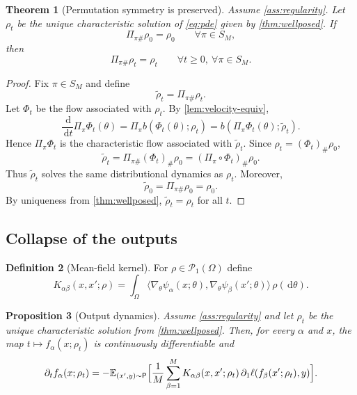 \documentclass[11pt]{article}
\newtheorem{theorem}{Theorem}[section]
\newtheorem{proposition}[theorem]{Proposition}
\theoremstyle{definition}
\newtheorem{definition}[theorem]{Definition}
\newcommand{\E}{\mathbb{E}}
\newcommand{\PP}{\mathcal{P}}
\newcommand{\dd}{\,\mathrm{d}}
\begin{document}
\begin{theorem}[Permutation symmetry is preserved]
\label{thm:symmetry}
Assume \cref{ass:regularity}.
Let $\rho_t$ be the unique characteristic solution of \eqref{eq:pde} given by \cref{thm:wellposed}.
If
\[
  \Pi_{\pi\#}\rho_0=\rho_0
  \qquad
  \forall \pi \in S_M,
\]
then
\[
  \Pi_{\pi\#}\rho_t=\rho_t
  \qquad
  \forall t\ge 0,\ \forall \pi \in S_M.
\]
\end{theorem}

\begin{proof}
Fix $\pi \in S_M$ and define
\[
  \widetilde{\rho}_t = \Pi_{\pi\#}\rho_t.
\]
Let $\Phi_t$ be the flow associated with $\rho_t$.
By \cref{lem:velocity-equiv},
\[
  \frac{\dd}{\dd t} \Pi_\pi \Phi_t(\theta)
  =
  \Pi_\pi b(\Phi_t(\theta);\rho_t)
  =
  b(\Pi_\pi \Phi_t(\theta);\widetilde{\rho}_t).
\]
Hence $\Pi_\pi \Phi_t$ is the characteristic flow associated with $\widetilde{\rho}_t$.
Since $\rho_t=(\Phi_t)_\# \rho_0$,
\[
  \widetilde{\rho}_t
  =
  \Pi_{\pi\#} (\Phi_t)_\# \rho_0
  =
  (\Pi_\pi \circ \Phi_t)_\# \rho_0.
\]
Thus $\widetilde{\rho}_t$ solves the same distributional dynamics as $\rho_t$.
Moreover,
\[
  \widetilde{\rho}_0=\Pi_{\pi\#}\rho_0=\rho_0.
\]
By uniqueness from \cref{thm:wellposed}, $\widetilde{\rho}_t=\rho_t$ for all $t$.
\end{proof}

\subsection{Collapse of the outputs}

\begin{definition}[Mean-field kernel]
For $\rho \in \PP_1(\Omega)$ define
\[
  K_{\alpha\beta}(x,x';\rho)
  =
  \int_\Omega
  \langle
    \nabla_\theta \psi_\alpha(x;\theta),
    \nabla_\theta \psi_\beta(x';\theta)
  \rangle
  \,\rho(\dd \theta).
\]
\end{definition}

\begin{proposition}[Output dynamics]
\label{prop:output-dynamics}
Assume \cref{ass:regularity} and let $\rho_t$ be the unique characteristic solution from \cref{thm:wellposed}.
Then, for every $\alpha$ and $x$, the map $t \mapsto f_\alpha(x;\rho_t)$ is continuously differentiable and
\begin{equation}
  \partial_t f_\alpha(x;\rho_t)
  =
  -
  \E_{(x',y)\sim \mathsf{P}}
  \Bigl[
    \frac1M \sum_{\beta=1}^M
    K_{\alpha\beta}(x,x';\rho_t)\,
    \partial_1 \ell(f_\beta(x';\rho_t),y)
  \Bigr].
  \label{eq:output-dynamics}
\end{equation}
\end{proposition}
\end{document}
